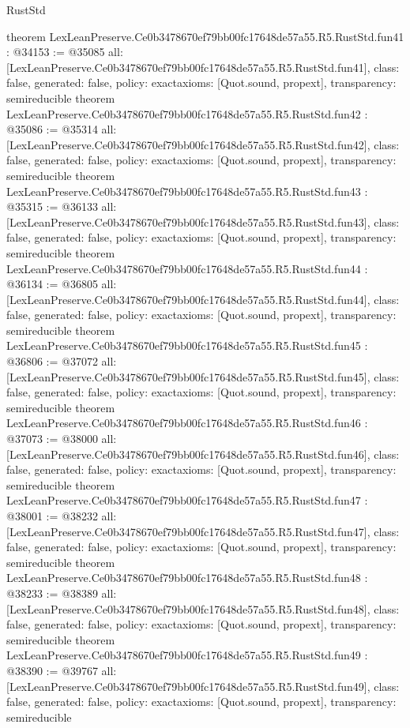 \begin{lexlean}{RustStd}
\begin{coremodule}
{}
theorem LexLeanPreserve.Ce0b3478670ef79bb00fc17648de57a55.R5.RustStd.fun41 : @34153 := @35085 {
  all: [LexLeanPreserve.Ce0b3478670ef79bb00fc17648de57a55.R5.RustStd.fun41],
  class: false,
  generated: false,
  policy: exact{axioms: [Quot.sound, propext]},
  transparency: semireducible
}
theorem LexLeanPreserve.Ce0b3478670ef79bb00fc17648de57a55.R5.RustStd.fun42 : @35086 := @35314 {
  all: [LexLeanPreserve.Ce0b3478670ef79bb00fc17648de57a55.R5.RustStd.fun42],
  class: false,
  generated: false,
  policy: exact{axioms: [Quot.sound, propext]},
  transparency: semireducible
}
theorem LexLeanPreserve.Ce0b3478670ef79bb00fc17648de57a55.R5.RustStd.fun43 : @35315 := @36133 {
  all: [LexLeanPreserve.Ce0b3478670ef79bb00fc17648de57a55.R5.RustStd.fun43],
  class: false,
  generated: false,
  policy: exact{axioms: [Quot.sound, propext]},
  transparency: semireducible
}
theorem LexLeanPreserve.Ce0b3478670ef79bb00fc17648de57a55.R5.RustStd.fun44 : @36134 := @36805 {
  all: [LexLeanPreserve.Ce0b3478670ef79bb00fc17648de57a55.R5.RustStd.fun44],
  class: false,
  generated: false,
  policy: exact{axioms: [Quot.sound, propext]},
  transparency: semireducible
}
theorem LexLeanPreserve.Ce0b3478670ef79bb00fc17648de57a55.R5.RustStd.fun45 : @36806 := @37072 {
  all: [LexLeanPreserve.Ce0b3478670ef79bb00fc17648de57a55.R5.RustStd.fun45],
  class: false,
  generated: false,
  policy: exact{axioms: [Quot.sound, propext]},
  transparency: semireducible
}
theorem LexLeanPreserve.Ce0b3478670ef79bb00fc17648de57a55.R5.RustStd.fun46 : @37073 := @38000 {
  all: [LexLeanPreserve.Ce0b3478670ef79bb00fc17648de57a55.R5.RustStd.fun46],
  class: false,
  generated: false,
  policy: exact{axioms: [Quot.sound, propext]},
  transparency: semireducible
}
theorem LexLeanPreserve.Ce0b3478670ef79bb00fc17648de57a55.R5.RustStd.fun47 : @38001 := @38232 {
  all: [LexLeanPreserve.Ce0b3478670ef79bb00fc17648de57a55.R5.RustStd.fun47],
  class: false,
  generated: false,
  policy: exact{axioms: [Quot.sound, propext]},
  transparency: semireducible
}
theorem LexLeanPreserve.Ce0b3478670ef79bb00fc17648de57a55.R5.RustStd.fun48 : @38233 := @38389 {
  all: [LexLeanPreserve.Ce0b3478670ef79bb00fc17648de57a55.R5.RustStd.fun48],
  class: false,
  generated: false,
  policy: exact{axioms: [Quot.sound, propext]},
  transparency: semireducible
}
theorem LexLeanPreserve.Ce0b3478670ef79bb00fc17648de57a55.R5.RustStd.fun49 : @38390 := @39767 {
  all: [LexLeanPreserve.Ce0b3478670ef79bb00fc17648de57a55.R5.RustStd.fun49],
  class: false,
  generated: false,
  policy: exact{axioms: [Quot.sound, propext]},
  transparency: semireducible
}
\end{coremodule}
\end{lexlean}
